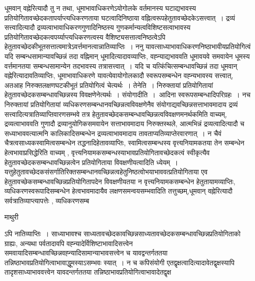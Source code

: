 \documentclass[10pt, openany]{book}
\begin{document}
{धूमवान् वह्नेरित्यादौ तु न तथा, धूमाभावाधिकरणेऽयोगोलके वर्तमानस्य घटाद्यभावस्य प्रतियोगितावच्छेदकतापर्याप्त्यधिकरणताया घटत्वादिनिष्ठाया
वह्नित्वरूपहेतुतावच्छेदकेऽसत्त्वात्~। द्रव्यं सत्त्वादित्यादौ द्रव्यत्वाभावाधिकरणगुणादिनिष्ठस्य गुणकर्मान्यत्वविशिष्टसत्वाभावस्य प्रतियोगितावच्छेदकत्वपर्य्याप्त्यधिकरणत्वस्य वैशिष्ट्यसत्तात्वनिष्ठत्वेऽपि हेतुतावच्छेदकीभूतसत्तात्वमात्रेऽवर्त्तमानत्वान्नातिव्याप्तिः~। ननु यावत्साध्याभावाधिकरणनिष्ठाभावीयप्रतियोगित्वं यदि सम्बन्धसामान्यावच्छिन्नं तदा वह्निमान् धूमादित्यादावव्याप्तिः, वह्न्याद्यभाववति धूमावयवे समवायेन धूमस्य वर्त्तमानतया सम्बन्धसामान्येन तदभावस्य तत्रासत्त्वात्~। यदि च यत्किंचित्सम्बन्धावच्छिन्नं तदा धूमवान् वह्नेरित्यादावतिव्याप्तिः, धूमाभावाधिकरणे यावत्येवायोगोलकादौ स्वरूपसम्बन्धेन वह्न्यभावस्य सत्त्वात्, अतआह निरुक्तलक्षणघटकीभूतं प्रतियोगित्वं चेत्यर्थः~। {\la तेनेति~।} निरुक्तायां प्रतियोगितायां हेतुतावच्छेदकसम्बन्धावच्छिन्नस्य विवक्षणेनेत्यर्थः~। {\qt संयोगादीति~।}~आदिना स्वरूपसम्बन्धादिपरिग्रहः~। नच निरुक्तायां प्रतियोगितायां व्यधिकरणसम्बन्धानवच्छिन्नत्वविवक्षणेनैव संयोगाद्यवच्छिन्नसत्ताभावमादाय द्रव्यं
सत्त्वादित्यत्रातिव्याप्तिवारणसम्भवे तत्र हेतुतावच्छेदकसम्बन्धावच्छिन्नत्वविवक्षणमनर्थकमिति वाच्यम्, द्रव्यत्वाभाववति गुणादौ द्रव्यानुयोगिकसमवायेन सत्ताभावमादाय निरुक्तस्थले, आत्मभिन्नं द्रव्यत्वादित्यादौ च सध्याभाववत्यात्मनि कालिकादिसम्बन्धेन द्रव्यत्वाभावमादाय तावताप्यतिव्याप्तेरवारणात्~। न चैवं चैत्रत्वसाध्यकस्वामित्वसम्बन्धेन तद्धनादिहेतावव्याप्तिः, स्वामित्वसम्बन्धस्य वृत्त्यनियामकतया तेन सम्बन्धेन हेत्वभावाप्रसिद्धेरिति वाच्यम् , वृत्त्यनियामकसम्बन्धस्याभावप्रतियोगितावच्छेदकत्वं स्वीकृत्यैव हेतुतावच्छेदकसम्बन्धावच्छिन्नत्वेन प्रतियोगिताया विवक्षणीयत्वादिति ध्येयम्~। यत्तुहेतुतावच्छेदकसंसर्गातिरिक्तसम्बन्धानवच्छिन्नत्वहेतुनिष्ठत्वोभयाभाववत्प्रतियोगिताया एव
हेतुतावच्छेकसम्बन्धावच्छिन्नप्रतियोगितापदेन विवक्षणीयतया न वृत्त्यनियामकसम्बन्धेन हेतुतायामव्याप्तिः, व्यधिकरणस्वरूपादिसम्बन्धेन हेत्वभावमादायैव लक्षणसमन्वयसम्भवादिति तत्तुच्छम्,धूमवान् वह्नेरित्यादौ सर्वत्रातिव्याप्त्यापत्तेः , व्यधिकरणसम्ब
\newpage
 \begin{center}  माथुरी  \end{center} 
{\la ऽपि नातिव्याप्तिः~। साध्याभावश्च साध्यतावच्छेदकावच्छिन्नसाध्यतावच्छेदकसम्बन्धावच्छिन्नप्रतियोगिताको ग्राह्यः, अन्यथा पर्वतादावपि वह्न्यादेर्विशिष्टाभावादिसत्त्वेन समवायादिसम्बन्धावच्छिन्नवह्न्यादिसामान्याभावसत्त्वेन च यावद्वन्तर्गततया तन्निष्ठाभावप्रतियोगित्वाभावाद्धूमस्याऽसम्भवः स्यात्~। न च कपिसंयोगी एतद्वृक्षत्वादित्यादावेतद्वृक्षस्यापि तादृशसाध्याभाववत्त्वेन यावदन्तर्गततया तन्निष्ठाभावप्रतियोगित्वाभावादेतद्वृक्ष\textendash}
}
\end{document}
